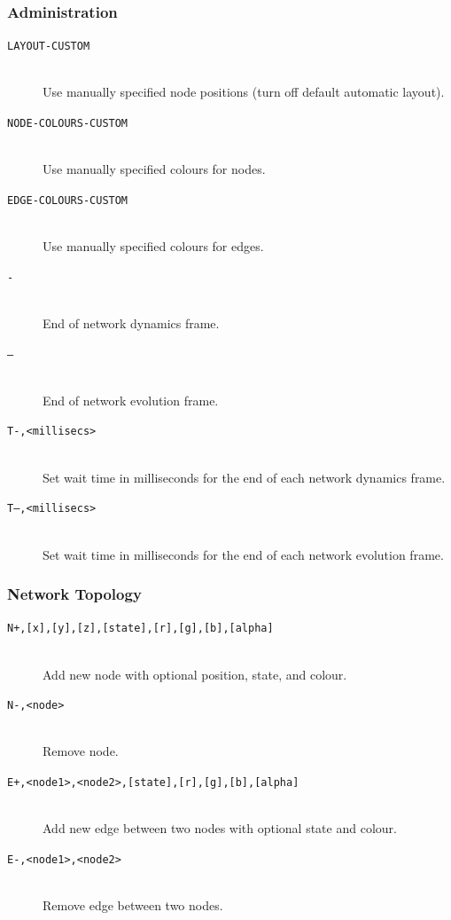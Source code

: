 \documentclass[a4paper, 11pt]{article}
\begin{document}
\subsubsection{Administration}
\begin{description}
\item[\small\texttt{LAYOUT-CUSTOM}] ~\\Use manually specified node positions (turn off default automatic layout).

\item[\small\texttt{NODE-COLOURS-CUSTOM}] ~\\Use manually specified colours for nodes.

\item[\small\texttt{EDGE-COLOURS-CUSTOM}] ~\\Use manually specified colours for edges.

\item[\small\texttt{-}] ~\\End of network dynamics frame.

\item[\small\texttt{--}] ~\\End of network evolution frame.

\item[\small\texttt{T-,<millisecs>}] ~\\Set wait time in milliseconds for the end of each network dynamics frame.

\item[\small\texttt{T--,<millisecs>}] ~\\Set wait time in milliseconds for the end of each network evolution frame.
\end{description}

\subsubsection{Network Topology}
\begin{description}
\item[\small\texttt{N+,[x],[y],[z],[state],[r],[g],[b],[alpha]}] ~\\Add new node with optional position, state, and colour.

\item[\small\texttt{N-,<node>}] ~\\Remove node.

\item[\small\texttt{E+,<node1>,<node2>,[state],[r],[g],[b],[alpha]}] ~\\Add new edge between two nodes with optional state and colour.

\item[\small\texttt{E-,<node1>,<node2>}] ~\\Remove edge between two nodes.
\end{description}
\end{document}
